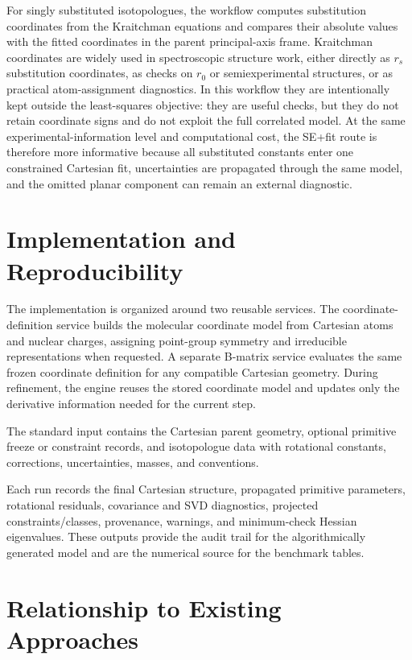\documentclass[aip,jcp,reprint,longbibliography,floatfix]{revtex4-2}
\begin{document}
For singly substituted isotopologues, the workflow computes substitution
coordinates from the Kraitchman equations\cite{Kraitchman1953} and compares
their absolute values with the fitted coordinates in the parent principal-axis
frame. Kraitchman coordinates are widely used in spectroscopic structure work,
either directly as $r_s$ substitution coordinates, as checks on $r_0$ or
semiexperimental structures, or as practical atom-assignment diagnostics. In
this workflow they are intentionally kept outside the least-squares objective:
they are useful checks, but they do not retain coordinate signs and do not
exploit the full correlated model. At the same experimental-information level
and computational cost, the SE+fit route is therefore more informative because
all substituted constants enter one constrained Cartesian fit, uncertainties
are propagated through the same model, and the omitted planar component can
remain an external diagnostic.


\section{Implementation and Reproducibility}

The implementation is organized around two reusable services. The
coordinate-definition service builds the molecular coordinate model from
Cartesian atoms and nuclear charges, assigning point-group symmetry and
irreducible representations when requested. A separate B-matrix service
evaluates the same frozen coordinate definition for any compatible Cartesian
geometry. During refinement, the engine reuses the stored coordinate model
and updates only the derivative information needed for the current step. 

The standard input contains the Cartesian parent geometry, optional primitive
freeze or constraint records, and isotopologue data with rotational constants,
corrections, uncertainties, masses, and conventions. 

Each run records the final Cartesian structure, propagated primitive
parameters, rotational residuals, covariance and SVD diagnostics, projected
constraints/classes, provenance, warnings, and minimum-check Hessian
eigenvalues. These outputs provide the audit trail for the algorithmically
generated model and are the numerical source for the benchmark tables. 


\section{Relationship to Existing Approaches}
\end{document}
